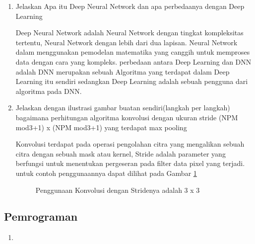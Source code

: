 \begin{enumerate}
\item Jelaskan Apa itu Deep Neural Network dan apa perbedaanya dengan Deep Learning
\par Deep Neural Network adalah Neural Network dengan tingkat kompleksitas tertentu, Neural Network dengan lebih dari dua lapisan.  Neural Network dalam menggunakan pemodelan matematika yang canggih untuk memproses data dengan cara yang kompleks. perbedaan antara Deep Learning dan DNN adalah DNN merupakan sebuah Algoritma yang terdapat dalam Deep Learning itu sendiri sedangkan Deep Learning adalah sebuah pengguna dari algoritma pada DNN.

\item Jelaskan dengan ilustrasi gambar buatan sendiri(langkah per langkah) bagaimana perhitungan algoritma konvolusi dengan ukuran stride (NPM mod3+1) x (NPM mod3+1) yang terdapat max pooling

\par Konvolusi terdapat pada operasi pengolahan citra yang mengalikan sebuah citra dengan sebuah mask atau kernel, Stride adalah parameter yang berfungsi untuk menentukan pergeseran pada filter data pixel yang terjadi. untuk contoh penggunaannya dapat dilihat pada Gambar \ref{data11}

\begin{figure}[!htbp]
      \caption{Penggunaan Konvolusi dengan Stridenya adalah 3 x 3}
      \label{data11}
\end{figure}

\end{enumerate}


\subsection{Pemrograman}
\begin{enumerate}
\item 
\end{enumerate}